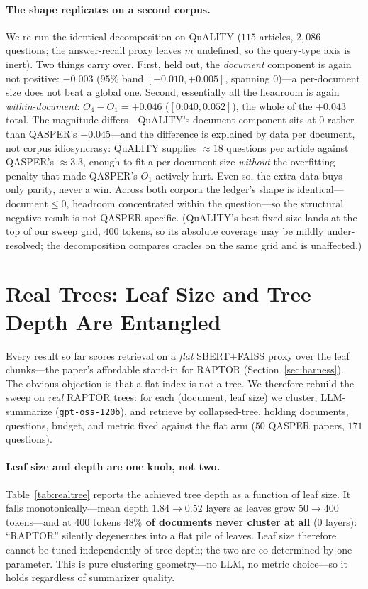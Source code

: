 \documentclass[11pt]{article}
\begin{document}
\paragraph{The shape replicates on a second corpus.} We re-run the identical
decomposition on QuALITY ($115$ articles, $2{,}086$ questions; the answer-recall
proxy leaves $m$ undefined, so the query-type axis is inert). Two things carry
over. First, held out, the \emph{document} component is again not positive:
$-0.003$ ($95\%$ band $[-0.010,+0.005]$, spanning $0$)---a per-document size does
not beat a global one. Second, essentially all the headroom is again
\emph{within-document}: $O_4-O_1=+0.046$ ($[0.040,0.052]$), the whole of the
$+0.043$ total. The magnitude differs---QuALITY's document component sits at $0$
rather than QASPER's $-0.045$---and the difference is explained by data per
document, not corpus idiosyncrasy: QuALITY supplies $\approx 18$ questions per
article against QASPER's $\approx 3.3$, enough to fit a per-document size
\emph{without} the overfitting penalty that made QASPER's $O_1$ actively hurt. Even
so, the extra data buys only parity, never a win. Across both corpora the ledger's
shape is identical---$\mathrm{document}\le 0$, headroom concentrated within the
question---so the structural negative result is not QASPER-specific. (QuALITY's best
fixed size lands at the top of our sweep grid, $400$ tokens, so its absolute
coverage may be mildly under-resolved; the decomposition compares oracles on the
same grid and is unaffected.)

\section{Real Trees: Leaf Size and Tree Depth Are Entangled}
\label{sec:realtree}

Every result so far scores retrieval on a \emph{flat} SBERT+FAISS proxy over the leaf
chunks---the paper's affordable stand-in for RAPTOR (Section~\ref{sec:harness}). The obvious
objection is that a flat index is not a tree. We therefore rebuild the sweep on \emph{real}
RAPTOR trees: for each (document, leaf size) we cluster, LLM-summarize
(\texttt{gpt-oss-120b}), and retrieve by collapsed-tree, holding documents, questions, budget,
and metric fixed against the flat arm ($50$ QASPER papers, $171$ questions).

\paragraph{Leaf size and depth are one knob, not two.} Table~\ref{tab:realtree} reports the
achieved tree depth as a function of leaf size. It falls monotonically---mean depth
$1.84\to0.52$ layers as leaves grow $50\to400$ tokens---and at $400$ tokens \textbf{$48\%$ of
documents never cluster at all} ($0$ layers): ``RAPTOR'' silently degenerates into a flat pile of
leaves. Leaf size therefore cannot be tuned independently of tree depth; the two are
co-determined by one parameter. This is pure clustering geometry---no LLM, no metric choice---so
it holds regardless of summarizer quality.
\end{document}
